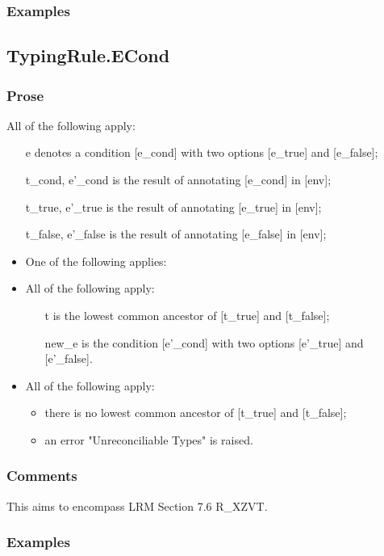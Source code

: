 \documentclass{book}
\begin{document}
  \subsubsection{Examples}

\subsection{TypingRule.ECond}

  \subsubsection{Prose}
  All of the following apply:
  \begin{itemize}
  \item  [e] denotes a condition [e\_cond] with two options [e\_true] and [e\_false];
  \item  [t\_cond, e'\_cond] is the result of annotating [e\_cond] in [env];
  \item  [t\_true, e'\_true] is the result of annotating [e\_true] in [env];
  \item  [t\_false, e'\_false] is the result of annotating [e\_false] in [env];
  \item  One of the following applies:
    \item  All of the following apply:
      \begin{itemize}
      \item  [t] is the lowest common ancestor of [t\_true] and [t\_false];
      \item  [new\_e] is the condition [e'\_cond] with two options [e'\_true] and [e'\_false].
      \end{itemize}
    \item  All of the following apply:
      \begin{itemize}
      \item  there is no lowest common ancestor of [t\_true] and [t\_false];
      \item  an error "Unreconciliable Types" is raised.
      \end{itemize}
  \end{itemize}

  \subsubsection{Comments}
  This aims to encompass LRM Section 7.6 R\_XZVT.

  \subsubsection{Examples}
\end{document}
